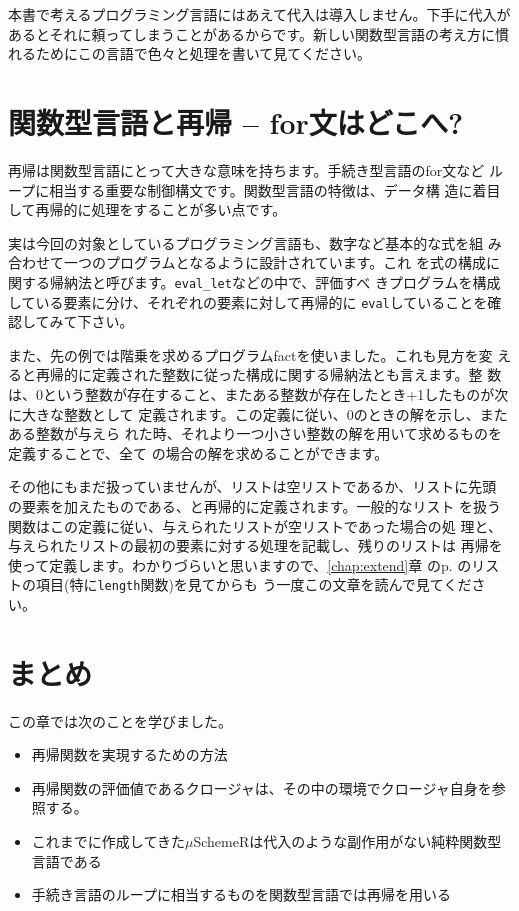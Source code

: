 本書で考えるプログラミング言語にはあえて代入は導入しません。下手に代入があるとそれに頼ってしまうことがあるからです。新しい関数型言語の考え方に慣れるためにこの言語で色々と処理を書いて見てください。


\section{関数型言語と再帰 -- for文はどこへ?}

再帰は関数型言語にとって大きな意味を持ちます。手続き型言語のfor文など
ループに相当する重要な制御構文です。関数型言語の特徴は、データ構
造に着目して再帰的に処理をすることが多い点です。

実は今回の対象としているプログラミング言語も、数字など基本的な式を組
み合わせて一つのプログラムとなるように設計されています。これ
を式の構成に関する帰納法と呼びます。{\tt eval\_let}などの中で、評価すべ
きプログラムを構成している要素に分け、それぞれの要素に対して再帰的に
{\tt eval}していることを確認してみて下さい。

また、先の例では階乗を求めるプログラムfactを使いました。これも見方を変
えると再帰的に定義された整数に従った構成に関する帰納法とも言えます。整
数
は、0という整数が存在すること、またある整数が存在したとき+1したものが次に大きな整数として
定義されます。この定義に従い、0のときの解を示し、またある整数が与えら
れた時、それより一つ小さい整数の解を用いて求めるものを定義することで、全て
の場合の解を求めることができます。

その他にもまだ扱っていませんが、リストは空リストであるか、リストに先頭
の要素を加えたものである、と再帰的に定義されます。一般的なリスト
を扱う関数はこの定義に従い、与えられたリストが空リストであった場合の処
理と、与えられたリストの最初の要素に対する処理を記載し、残りのリストは
再帰を使って定義します。わかりづらいと思いますので、\ref{chap:extend}章
のp. \pageref{sec:list}のリストの項目(特に{\tt length}関数)を見てからも
う一度この文章を読んで見てください。


\section{まとめ}

この章では次のことを学びました。

\begin{itemize}
\item 再帰関数を実現するための方法
\item 再帰関数の評価値であるクロージャは、その中の環境でクロージャ自身を参照する。
\item これまでに作成してきた$\mu$SchemeRは代入のような副作用がない純粋関数型言語である
\item 手続き言語のループに相当するものを関数型言語では再帰を用いる
\end{itemize}

